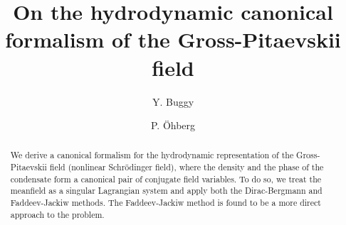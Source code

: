 \documentclass[twocolumn, nofootinbib, nobibnotes, amsmath,amssymb,aps, pra, floatfix]{revtex4-1}
\begin{document}

\title{On the hydrodynamic canonical formalism of the Gross-Pitaevskii field}%

\author{Y. Buggy}
 \author{P. {\"O}hberg}


\begin{abstract}
We derive a canonical formalism for the hydrodynamic representation of the Gross-Pitaevskii field (nonlinear Schr\"odinger field), where the density and the phase of the condensate form a canonical pair of conjugate field variables.
To do so, we treat the meanfield as a singular Lagrangian system and apply both the Dirac-Bergmann and Faddeev-Jackiw methods.
The Faddeev-Jackiw method is found to be a more direct approach to the problem.
\\\\\\
\end{abstract}

\maketitle

\end{document}
